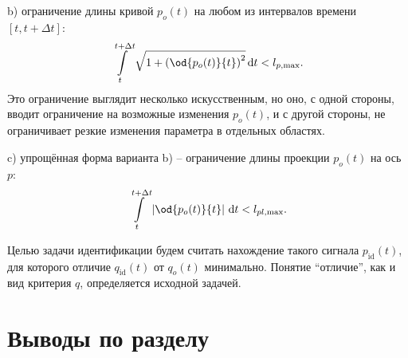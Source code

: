b) ограничение длины кривой $p_o(t)$ на любом из интервалов времени $[t,t+\Delta t]$:
\begin{equation}
  \int\limits_{t}^{t+\Delta t} \sqrt{1 + \left( \od{p_o(t)}{t} \right)^2 } \, \mathrm{d}t < l_{p,\max}.
  \label{atu:eq:p_lim_l}
\end{equation}
%
Это ограничение выглядит несколько искусственным,
но оно, с одной стороны, вводит ограничение на возможные изменения $p_o(t)$,
и с другой стороны, не ограничивает резкие изменения параметра в отдельных областях.

c) упрощённая форма варианта b) -- ограничение длины проекции  $p_o(t)$ на ось $p$:
\begin{equation}
  \int\limits_{t}^{t+\Delta t} \left| \od{p_o(t)}{t} \right | \, \mathrm{d}t < l_{pl,\max}.
  \label{atu:eq:p_lim_pl}
\end{equation}

Целью задачи идентификации будем считать нахождение
такого сигнала $p_\mathrm{id}(t)$, для которого
отличие $q_\mathrm{id}(t)$ от $q_o(t)$ минимально.
Понятие ``отличие'', как и вид критерия $q$, определяется исходной задачей.









\section{Выводы по разделу \thechapter}  %




